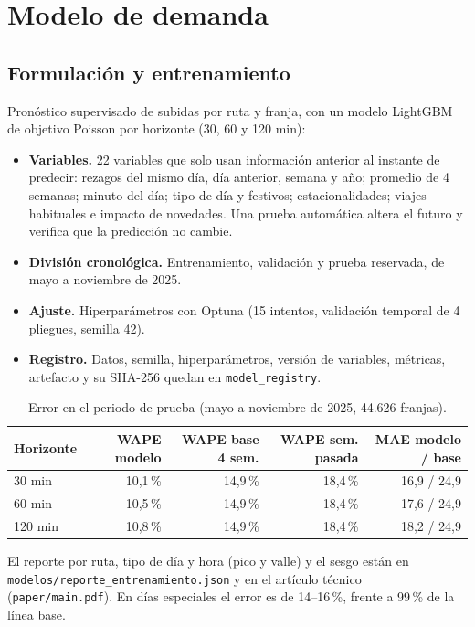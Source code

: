 \documentclass[10pt,a4paper]{article}
\newcommand{\cod}[1]{\texttt{\small #1}}
\begin{document}
\section{Modelo de demanda}

\subsection{Formulación y entrenamiento}

Pronóstico supervisado de subidas por ruta y franja, con un modelo LightGBM de objetivo Poisson por horizonte (30, 60 y 120 min):

\begin{itemize}
  \item \textbf{Variables.} 22 variables que solo usan información anterior al instante de predecir: rezagos del mismo día, día anterior, semana y año; promedio de 4 semanas; minuto del día; tipo de día y festivos; estacionalidades; viajes habituales e impacto de novedades. Una prueba automática altera el futuro y verifica que la predicción no cambie.
  \item \textbf{División cronológica.} Entrenamiento, validación y prueba reservada, de mayo a noviembre de 2025.
  \item \textbf{Ajuste.} Hiperparámetros con Optuna (15 intentos, validación temporal de 4 pliegues, semilla 42).
  \item \textbf{Registro.} Datos, semilla, hiperparámetros, versión de variables, métricas, artefacto y su SHA-256 quedan en \cod{model\_registry}.
\end{itemize}

\begin{table}[H]
\centering\small
\caption{Error en el periodo de prueba (mayo a noviembre de 2025, 44.626 franjas).}
\begin{tabular}{lrrrr}
\toprule
\textbf{Horizonte} & \textbf{WAPE modelo} & \textbf{WAPE base 4 sem.} & \textbf{WAPE sem. pasada} & \textbf{MAE modelo / base} \\
\midrule
30 min & 10,1\,\% & 14,9\,\% & 18,4\,\% & 16,9 / 24,9 \\
60 min & 10,5\,\% & 14,9\,\% & 18,4\,\% & 17,6 / 24,9 \\
120 min & 10,8\,\% & 14,9\,\% & 18,4\,\% & 18,2 / 24,9 \\
\bottomrule
\end{tabular}
\end{table}

El reporte por ruta, tipo de día y hora (pico y valle) y el sesgo están en \cod{modelos/reporte\_entrenamiento.json} y en el artículo técnico (\cod{paper/main.pdf}). En días especiales el error es de 14--16\,\%, frente a 99\,\% de la línea base.
\end{document}

